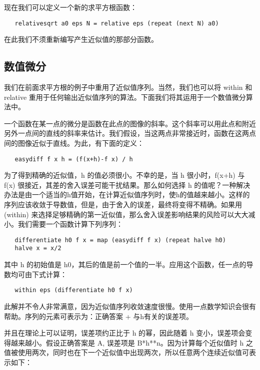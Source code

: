 \documentclass[12pt]{article}
\begin{document}
现在我们可以定义一个新的求平方根函数：

\begin{verbatim}
   relativesqrt a0 eps N = relative eps (repeat (next N) a0)
\end{verbatim}

在此我们不须重新编写产生近似值的那部分函数。

\subsection{数值微分}

我们在前面求平方根的例子中重用了近似值序列。当然，我们也可以将 within 和 relative 重用于任何输出近似值序列的算法。下面我们将其运用于一个数值微分算法中。

一个函数在某一点的微分是函数在此点的图像的斜率。这个斜率可以用此点和附近另外一点间的直线的斜率来估计。我们假设，当这两点非常接近时，函数在这两点间的图像近似于直线。为此，有下面的定义：

\begin{verbatim}
   easydiff f x h = (f(x+h)-f x) / h
\end{verbatim}

为了得到精确的近似值，h 的值必须很小。不幸的是，当 h 很小时，f(x+h) 与 f(x) 很接近，其差的舍入误差可能干扰结果。那么如何选择 h 的值呢？一种解决办法是由一个适当的h值开始，在计算近似值序列时，使h的值越来越小。这样的序列应该收敛于导数值，但是，由于舍入的误差，最终将变得不精确。如果用 (within) 来选择足够精确的第一近似值，那么舍入误差影响结果的风险可以大大减小。我们需要一个函数计算下列序列：

\begin{verbatim}
   differentiate h0 f x = map (easydiff f x) (repeat halve h0)
   halve x = x/2
\end{verbatim}

其中 h 的初始值是 h0，其后的值是前一个值的一半。应用这个函数，任一点的导数均可由下式计算：

\begin{verbatim}
   within eps (differentiate h0 f x)
\end{verbatim}

此解并不令人非常满意，因为近似值序列收敛速度很慢。使用一点数学知识会很有帮助。序列的元素可表示为：正确答案 + 与h有关的误差项。

并且在理论上可以证明，误差项约正比于 h 的幂，因此随着 h 变小，误差项会变得越来越小。假设正确答案是 A, 误差项是 B*h**n。因为计算每个近似值时 h 之值被使用两次，同时也在下一个近似值中出现两次，所以任意两个连续近似值可表示如下：
\end{document}
